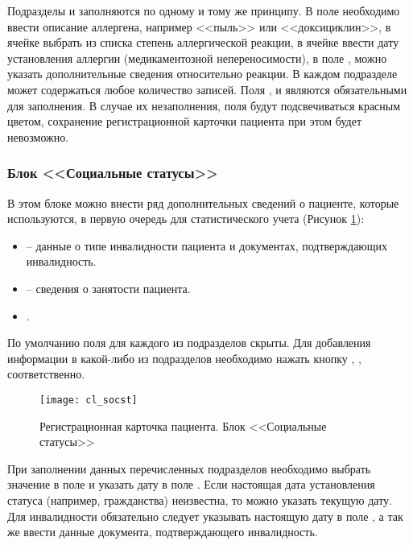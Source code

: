 Подразделы  и  заполняются по одному и тому же принципу. В поле   необходимо ввести описание аллергена, например <<пыль>> или <<доксициклин>>, в ячейке  выбрать из списка степень аллергической реакции, в ячейке  ввести дату установления аллергии (медикаментозной непереносимости), в поле , можно указать дополнительные сведения относительно реакции. В каждом подразделе может содержаться любое количество записей. Поля ,  и  являются обязательными для заполнения. В случае их незаполнения, поля будут подсвечиваться красным цветом, сохранение регистрационной карточки пациента при этом будет невозможно.

\subsubsection{Блок <<Социальные статусы>>} 

В этом блоке можно внести ряд дополнительных сведений о пациенте, которые используются, в первую очередь для статистического учета (Рисунок \ref{img_cl_socst}): 
\begin{itemize}
 \item {} -- данные о типе инвалидности пациента и документах, подтверждающих инвалидность.
 \item {} -- сведения о занятости пациента.
 \item {}.
\end{itemize}

По умолчанию поля для каждого из подразделов скрыты. Для добавления информации в какой-либо из подразделов необходимо нажать кнопку , ,  соответственно.

\begin{figure}[ht]\centering
 \texttt{[image: cl\_socst]}
 \caption{Регистрационная карточка пациента. Блок <<Социальные статусы>>}
 \label{img_cl_socst}
\end{figure} 

При заполнении данных перечисленных подразделов необходимо выбрать значение в поле  и указать дату в поле . Если настоящая дата установления статуса (например, гражданства) неизвестна, то можно указать текущую дату. Для инвалидности обязательно следует указывать настоящую дату в поле , а так же ввести данные документа, подтверждающего инвалидность.


